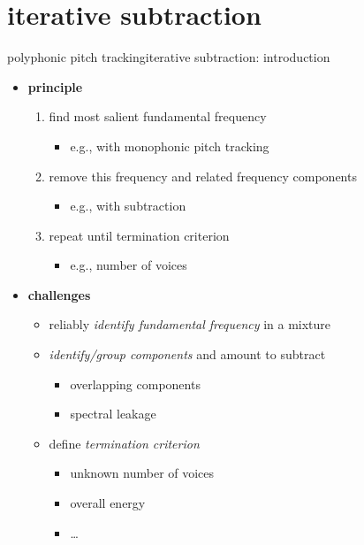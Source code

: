     \section[iterative subtraction]{iterative subtraction}
	\begin{frame}{polyphonic pitch tracking}{iterative subtraction: introduction}
        \begin{itemize}
            \item \textbf{principle}
                \begin{enumerate}
                    \item	find most salient fundamental frequency 
                        \begin{itemize}
                            \item   e.g., with monophonic pitch tracking
                        \end{itemize}
                    \item<2->	remove this frequency and related frequency components
                        \begin{itemize}
                            \item   e.g., with subtraction
                        \end{itemize}
                    \item<3->	repeat until termination criterion
                        \begin{itemize}
                            \item   e.g., number of voices
                        \end{itemize}
                \end{enumerate}
            \bigskip
            \item<4->   \textbf{challenges}            
            \begin{itemize}
                \item<4->	reliably \textit{identify fundamental frequency} in a mixture
                \item<5->	\textit{identify/group components} and amount to subtract
                    \begin{itemize}
                        \item   overlapping components
                        \item   spectral leakage
                    \end{itemize}
                \item<6->	define \textit{termination criterion}
                    \begin{itemize}
                        \item   unknown number of voices
                        \item   overall energy
                        \item   \dots
                    \end{itemize}
            \end{itemize}
        \end{itemize}
	\end{frame}
	

